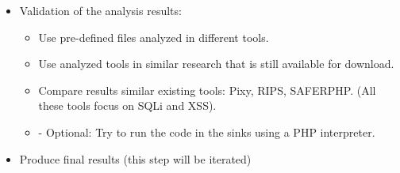 \documentclass[../main.tex]{subfiles}
\begin{document}
\begin{itemize}[noitemsep,nolistsep]
        \item Validation of the analysis results:
        \begin{itemize}[noitemsep,nolistsep]
            \item Use pre-defined files analyzed in different tools.
            \item Use analyzed tools in similar research that is still available for download.
            \item Compare results similar existing tools: Pixy, RIPS, SAFERPHP. (All these tools focus on SQLi and XSS).
            \item - Optional: Try to run the code in the sinks using a PHP interpreter.
        \end{itemize}
    \item Produce final results (this step will be iterated)
    \end{itemize}
\end{document}
